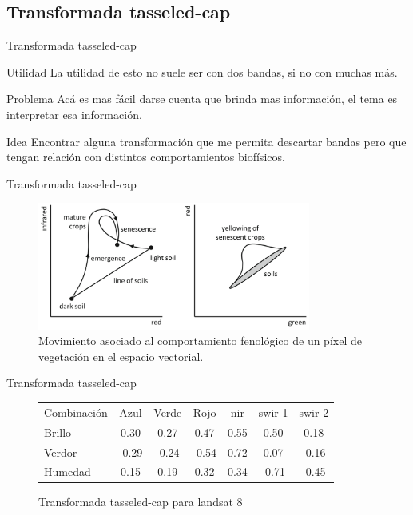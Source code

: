 \documentclass[]{beamer}
\begin{document}
\subsection{Transformada tasseled-cap}

\begin{frame}{Transformada tasseled-cap}
  \begin{block}{Utilidad}
    La utilidad de esto no suele ser con dos bandas, si no con muchas más.
  \end{block}\pause
  \begin{block}{Problema}
    Acá es mas fácil darse cuenta que brinda mas información, el tema es interpretar esa información.
  \end{block}\pause
  \begin{block}{Idea}
    Encontrar alguna transformación que me permita descartar bandas pero que tengan relación con distintos comportamientos biofísicos.
  \end{block}
\end{frame}

\begin{frame}{Transformada tasseled-cap}
  \begin{figure}
  \centering
  \includegraphics[width=0.8\textwidth]{imagenes/tc.png}
  \caption{Movimiento asociado al comportamiento fenológico de un píxel de vegetación en el espacio vectorial.}
  \end{figure}
\end{frame}


\begin{frame}{Transformada tasseled-cap}
    \begin{figure}
      \begin{tabular}{l c c c c c c }
        Combinación  & Azul & Verde & Rojo & nir & swir 1 & swir 2\\
        Brillo &  0.30  & 0.27  & 0.47  & 0.55  & 0.50  & 0.18\\
        Verdor & -0.29  &-0.24  &-0.54  & 0.72 & 0.07  &-0.16\\
        Humedad&  0.15  & 0.19  & 0.32  & 0.34  &-0.71  &-0.45
      \end{tabular}
      \caption{Transformada tasseled-cap para landsat 8 }
    \end{figure}
\end{frame}
\end{document}
